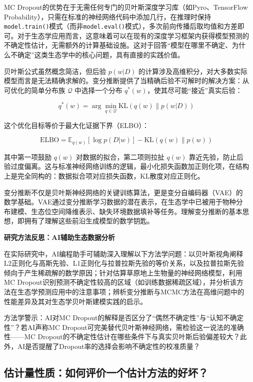 \documentclass[
  twoside,12pt,fontset=none]{ctexbook}
\renewenvironment{quote}{%
  \def\FrameCommand{{\color{quote-border}\vrule width 4pt}\hspace{10pt}}%
  \MakeFramed {\advance\hsize-\width \FrameRestore\noindent\ignorespaces}%
}{%
  \endMakeFramed
}
\begin{document}
MC Dropout的优势在于无需任何专门的贝叶斯深度学习库（如Pyro、TensorFlow Probability），只需在标准的神经网络代码中添加几行，在推理时保持\texttt{model.train()}模式（而非\texttt{model.eval()}模式），多次前向传播后取均值和方差即可。对于生态学应用而言，这意味着可以在现有的深度学习框架内获得模型预测的不确定性估计，无需额外的计算基础设施。这对于回答``模型在哪里不确定、为什么不确定''这类生态学中的核心问题，具有直接的实践价值。

贝叶斯公式虽然概念简洁，但后验 \(p(w|D)\) 的计算涉及高维积分，对大多数实际模型而言是无法精确求解的。变分推断提供了当精确后验不可解时的解决方案：从可优化的简单分布族 \(\mathcal{Q}\) 中选择一个分布 \(q^*(w)\)，使其尽可能``接近''真实后验：

\[q^*(w) = \arg\min_{q \in \mathcal{Q}} \text{KL}(q(w) \parallel p(w|D))\]

这个优化目标等价于最大化证据下界（ELBO）：

\[\text{ELBO} = \mathbb{E}_{q(w)}[\log p(D|w)] - \text{KL}(q(w) \parallel p(w))\]

其中第一项鼓励 \(q(w)\) 对数据的拟合，第二项则拉扯 \(q(w)\) 靠近先验，防止后验过度偏离。这与标准神经网络训练的逻辑，最小化损失函数加正则化项，在结构上是完全同构的：数据拟合项对应损失函数，KL散度对应正则化。

变分推断不仅是贝叶斯神经网络的关键训练算法，更是变分自编码器（VAE）的数学基础。VAE通过变分推断学习数据的潜在表示，在生态学中已被用于物种分布建模、生态位空间降维表示、缺失环境数据填补等任务。理解变分推断的基本思想，即拥有了理解这些前沿生成模型的数学钥匙。

\begin{quote}
\textbf{研究方法反思：AI辅助生态数据分析}

在实际研究中，AI编程助手可辅助深入理解以下方法学问题：以贝叶斯视角阐释L2正则化与高斯先验、L1正则化与拉普拉斯先验的等价关系，以及拉普拉斯先验倾向于产生稀疏解的数学原因；针对估算草原地上生物量的神经网络模型，利用MC Dropout识别预测不确定性较高的区域（如训练数据稀疏区域），并分析该方法在生态学预测应用中的注意事项；辨析变分推断与MCMC方法在高维问题中的性能差异及其对生态学贝叶斯建模实践的启示。

方法学警示：AI对MC Dropout的解释是否区分了``偶然不确定性''与``认知不确定性''？若AI声称MC Dropout可完美替代贝叶斯神经网络，需检验这一说法的准确性------MC Dropout的不确定性估计在哪些条件下与真实贝叶斯后验偏差较大？此外，AI是否提醒了Dropout率的选择会影响不确定性的校准质量？
\end{quote}

\hypertarget{ux4f30ux8ba1ux91cfux6027ux8d28ux5982ux4f55ux8bc4ux4ef7ux4e00ux4e2aux4f30ux8ba1ux65b9ux6cd5ux7684ux597dux574f}{%
\subsection{估计量性质：如何评价一个估计方法的好坏？}\label{ux4f30ux8ba1ux91cfux6027ux8d28ux5982ux4f55ux8bc4ux4ef7ux4e00ux4e2aux4f30ux8ba1ux65b9ux6cd5ux7684ux597dux574f}}
\end{document}
